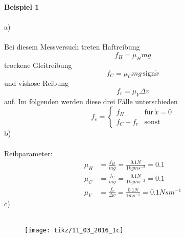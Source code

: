 \textbf{Beispiel 1} \\ \\
a) \\ \\
Bei diesem Messversuch treten Haftreibung
\[
	f_H = \mu_Hmg
\]
trockene Gleitreibung
\[
	f_C = \mu_C m g \, \text{sign}\dot{x}
\]
und viskose Reibung
\[
	f_r = \mu_V \Delta v
\]
auf.
Im folgenden werden diese drei Fälle unterschieden
\[
	f_e = \begin{cases}
		f_H & \text{für} \, \dot{x} = 0 \\
		f_C + f_r & \text{sonst}
	\end{cases}
\]
b) \\ \\
Reibparameter:
\begin{align*}
	\mu_H &= \frac{f_H}{mg} = \frac{0.1 N}{1kgms^{-2}} = 0.1 \\
	\mu_C &= \frac{f_C}{mg} = \frac{0.1 N}{1kgms^{-2}} = 0.1 \\
	\mu_V &= \frac{f_r}{\Delta v} = \frac{0.1N}{1ms^{-1}} = 0.1 Nsm^{-1}
\end{align*}
c) \\ \\
\begin{figure}[h]
	\centering
	\texttt{[image: tikz/11\_03\_2016\_1c]}
\end{figure}